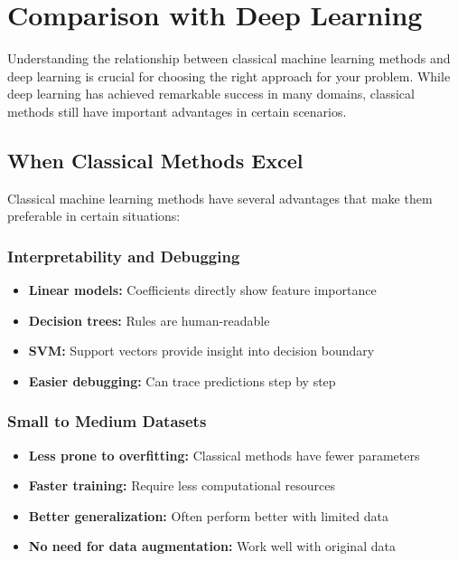 
\section{Comparison with Deep Learning}
\label{sec:comparison}

Understanding the relationship between classical machine learning methods and deep learning is crucial for choosing the right approach for your problem. While deep learning has achieved remarkable success in many domains, classical methods still have important advantages in certain scenarios.

\subsection{When Classical Methods Excel}

Classical machine learning methods have several advantages that make them preferable in certain situations:

\subsubsection{Interpretability and Debugging}
\begin{itemize}
    \item \textbf{Linear models:} Coefficients directly show feature importance
    \item \textbf{Decision trees:} Rules are human-readable
    \item \textbf{SVM:} Support vectors provide insight into decision boundary
    \item \textbf{Easier debugging:} Can trace predictions step by step
\end{itemize}

\subsubsection{Small to Medium Datasets}
\begin{itemize}
    \item \textbf{Less prone to overfitting:} Classical methods have fewer parameters
    \item \textbf{Faster training:} Require less computational resources
    \item \textbf{Better generalization:} Often perform better with limited data
    \item \textbf{No need for data augmentation:} Work well with original data
\end{itemize}

